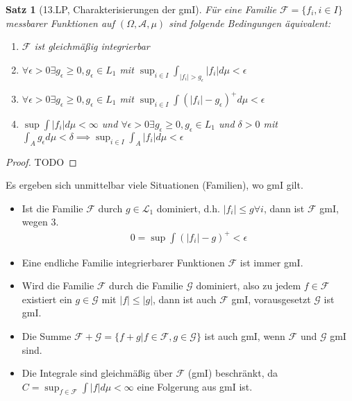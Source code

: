 \documentclass[]{article}
\newtheorem{theorem}{Satz}
\begin{document}
\begin{theorem}[13.LP, Charakterisierungen der gmI]
	Für eine Familie $\mathcal{F}=\{f_i, i\in I\}$ messbarer Funktionen auf $(\Omega, \mathcal{A}, \mu)$ sind folgende Bedingungen äquivalent:
	\begin{enumerate}
		\item $\mathcal{F}$ ist gleichmäßig integrierbar
		\item $\forall \epsilon > 0 \exists g_\epsilon \geq 0, g_\epsilon \in L_1$ mit $\sup_{i\in I} \int_{|f_i| > g_\epsilon} |f_i| d\mu < \epsilon$
		\item $\forall \epsilon > 0 \exists g_\epsilon \geq 0, g_\epsilon \in L_1$ mit $\sup_{i\in I} \int (|f_i| - g_\epsilon)^+ d\mu < \epsilon$
		\item $\sup \int |f_i| d\mu < \infty$ und $\forall \epsilon > 0 \exists g_\epsilon \geq 0, g_\epsilon \in L_1$ und $\delta > 0$ mit $\int_A g_\epsilon d\mu < \delta \implies \sup_{i\in I} \int_A |f_i| d\mu < \epsilon$
	\end{enumerate}
\end{theorem}

\begin{proof}
	TODO
\end{proof}

Es ergeben sich unmittelbar viele Situationen (Familien), wo gmI gilt.

\begin{itemize}
	\item Ist die Familie $\mathcal{F}$ durch $g\in \mathcal{L}_1$ dominiert, d.h. $|f_i| \leq g \forall i$, dann ist $\mathcal{F}$ gmI, wegen 3.
	\begin{align*}
		0 = \sup \int (|f_i| - g)^+ < \epsilon
	\end{align*}

	\item Eine endliche Familie integrierbarer Funktionen $\mathcal{F}$ ist immer gmI.
	
	\item Wird die Familie $\mathcal{F}$ durch die Familie $\mathcal{G}$ dominiert, also zu jedem $f\in \mathcal{F}$ existiert ein $g \in \mathcal{G}$ mit $|f|\leq |g|$, dann ist auch $\mathcal{F}$ gmI, vorausgesetzt $\mathcal{G}$ ist gmI.
	
	\item Die Summe $\mathcal{F} + \mathcal{G} = \{f+g|f\in \mathcal{F}, g \in \mathcal{G}\}$ ist auch gmI, wenn $\mathcal{F}$ und $\mathcal{G}$ gmI sind.
	
	\item Die Integrale sind gleichmäßig über $\mathcal{F}$ (gmI) beschränkt, da $C = \sup_{f\in\mathcal{F}} \int |f| d\mu < \infty$ eine Folgerung aus gmI ist.
\end{itemize}
\end{document}
